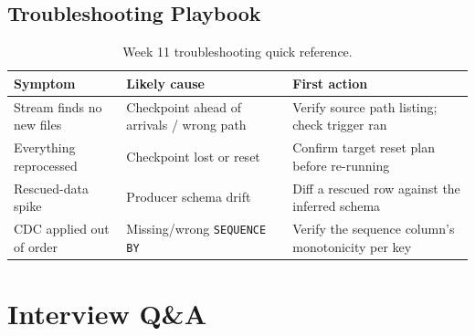 \subsection{Troubleshooting Playbook}
\begin{table}[H]
\centering
\small
\begin{tabular}{@{}p{3.6cm}p{4.2cm}p{4.8cm}@{}}
\toprule
\textbf{Symptom} & \textbf{Likely cause} & \textbf{First action} \\
\midrule
Stream finds no new files & Checkpoint ahead of arrivals / wrong path & Verify source path listing; check trigger ran \\
Everything reprocessed & Checkpoint lost or reset & Confirm target reset plan before re-running \\
Rescued-data spike & Producer schema drift & Diff a rescued row against the inferred schema \\
CDC applied out of order & Missing/wrong \texttt{SEQUENCE BY} & Verify the sequence column's monotonicity per key \\
\bottomrule
\end{tabular}
\caption{Week 11 troubleshooting quick reference.}
\label{tab:ch11-trouble}
\end{table}

\section{Interview Q\&A}
